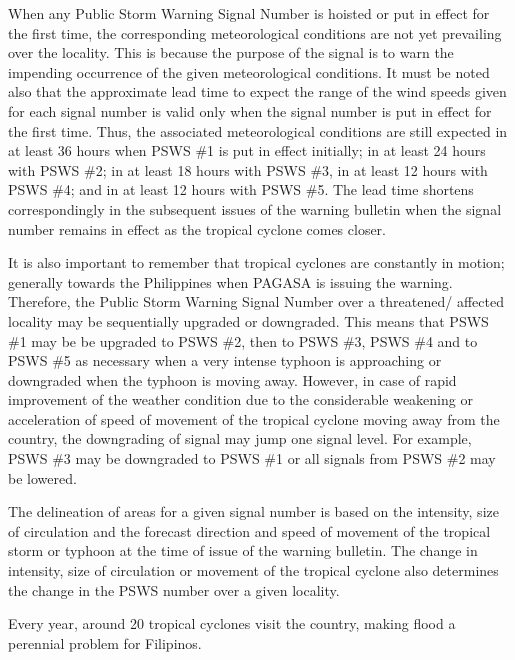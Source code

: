 \documentclass[runningheads]{llncs}
\begin{document}
When any Public Storm Warning Signal Number is hoisted or put in effect for the first time, the corresponding meteorological conditions are not yet prevailing over the locality. This is because the purpose of the signal is to warn the impending occurrence of the given meteorological conditions. It must be noted also that the approximate lead time to expect the range of the wind speeds given for each signal number is valid only when the signal number is put in effect for the first time. Thus, the associated meteorological conditions are still expected in at least 36 hours when PSWS \#1 is put in effect initially; in at least 24 hours with PSWS \#2; in at least 18 hours with PSWS \#3, in at least 12 hours with PSWS \#4; and in at least 12 hours with PSWS \#5. The lead time shortens correspondingly in the subsequent issues of the warning bulletin when the signal number remains in effect as the tropical cyclone comes closer.


It is also important to remember that tropical cyclones are constantly in motion; generally towards the Philippines when PAGASA is issuing the warning. Therefore, the Public Storm Warning Signal Number over a threatened/ affected locality may be sequentially upgraded or downgraded. This means that PSWS \#1 may be be upgraded to PSWS \#2, then to PSWS \#3, PSWS \#4 and to PSWS \#5 as necessary when a very intense typhoon is approaching or downgraded when the typhoon is moving away. However, in case of rapid improvement of the weather condition due to the considerable weakening or acceleration of speed of movement of the tropical cyclone moving away from the country, the downgrading of signal may jump one signal level. For example, PSWS \#3 may be downgraded to PSWS \#1 or all signals from PSWS \#2 may be lowered.

The delineation of areas for a given signal number is based on the intensity, size of circulation and the forecast direction and speed of movement of the tropical storm or typhoon at the time of issue of the warning bulletin. The change in intensity, size of circulation or movement of the tropical cyclone also determines the change in the PSWS number over a given locality.


Every year, around 20 tropical cyclones visit the country, making flood a perennial problem for Filipinos.
\end{document}
